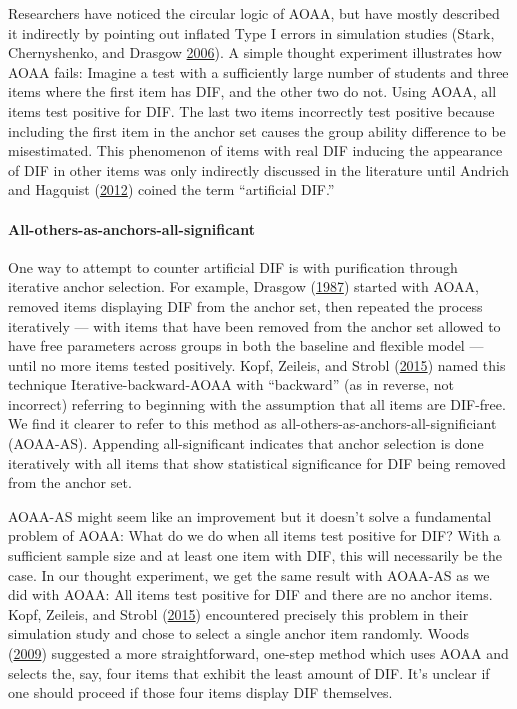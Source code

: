 \documentclass[
  11pt,
]{article}
\begin{document}
Researchers have noticed the circular logic of AOAA, but have mostly described it indirectly by pointing out inflated Type I errors in simulation studies (Stark, Chernyshenko, and Drasgow \protect\hyperlink{ref-stark2006detecting}{2006}). A simple thought experiment illustrates how AOAA fails: Imagine a test with a sufficiently large number of students and three items where the first item has DIF, and the other two do not. Using AOAA, all items test positive for DIF. The last two items incorrectly test positive because including the first item in the anchor set causes the group ability difference to be misestimated. This phenomenon of items with real DIF inducing the appearance of DIF in other items was only indirectly discussed in the literature until Andrich and Hagquist (\protect\hyperlink{ref-andrich2012real}{2012}) coined the term \enquote{artificial DIF.}

\hypertarget{all-others-as-anchors-all-significant}{%
\paragraph{All-others-as-anchors-all-significant}\label{all-others-as-anchors-all-significant}}

One way to attempt to counter artificial DIF is with purification through iterative anchor selection. For example, Drasgow (\protect\hyperlink{ref-drasgow1987study}{1987}) started with AOAA, removed items displaying DIF from the anchor set, then repeated the process iteratively --- with items that have been removed from the anchor set allowed to have free parameters across groups in both the baseline and flexible model --- until no more items tested positively. Kopf, Zeileis, and Strobl (\protect\hyperlink{ref-kopf2015framework}{2015}) named this technique Iterative-backward-AOAA with \enquote{backward} (as in reverse, not incorrect) referring to beginning with the assumption that all items are DIF-free. We find it clearer to refer to this method as all-others-as-anchors-all-significiant (AOAA-AS). Appending all-significant indicates that anchor selection is done iteratively with all items that show statistical significance for DIF being removed from the anchor set.

AOAA-AS might seem like an improvement but it doesn't solve a fundamental problem of AOAA: What do we do when all items test positive for DIF? With a sufficient sample size and at least one item with DIF, this will necessarily be the case. In our thought experiment, we get the same result with AOAA-AS as we did with AOAA: All items test positive for DIF and there are no anchor items. Kopf, Zeileis, and Strobl (\protect\hyperlink{ref-kopf2015framework}{2015}) encountered precisely this problem in their simulation study and chose to select a single anchor item randomly. Woods (\protect\hyperlink{ref-woods2009empirical}{2009}) suggested a more straightforward, one-step method which uses AOAA and selects the, say, four items that exhibit the least amount of DIF. It's unclear if one should proceed if those four items display DIF themselves.
\end{document}
